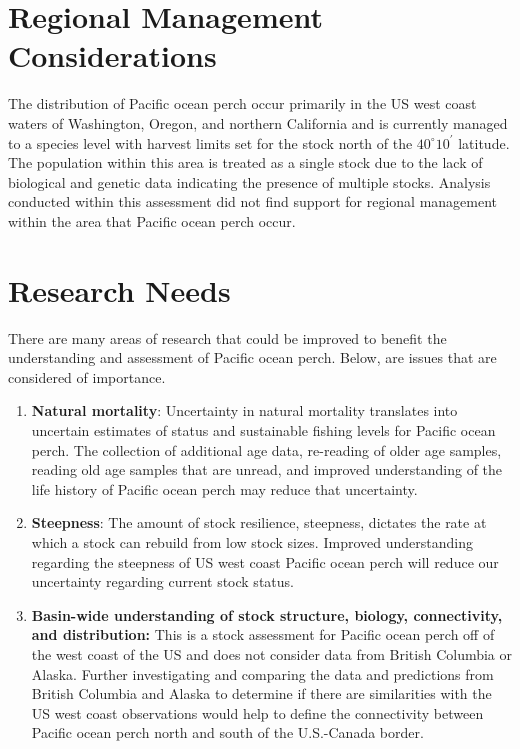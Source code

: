 \documentclass[12pt,]{article}
\begin{document}
\section{Regional Management
Considerations}\label{regional-management-considerations}

The distribution of Pacific ocean perch occur primarily in the US west
coast waters of Washington, Oregon, and northern California and is
currently managed to a species level with harvest limits set for the
stock north of the \(40^\circ 10^\prime\) latitude. The population
within this area is treated as a single stock due to the lack of
biological and genetic data indicating the presence of multiple stocks.
Analysis conducted within this assessment did not find support for
regional management within the area that Pacific ocean perch occur.

\section{Research Needs}\label{research-needs}

There are many areas of research that could be improved to benefit the
understanding and assessment of Pacific ocean perch. Below, are issues
that are considered of importance.

\begin{enumerate}

\item \textbf{Natural mortality}: Uncertainty in natural mortality translates into uncertain estimates of status and sustainable fishing levels for Pacific ocean perch. The collection of additional age data, re-reading of older age samples, reading old age samples that are unread, and improved understanding of the life history of Pacific ocean perch may reduce that uncertainty.

\item \textbf{Steepness}: The amount of stock resilience, steepness, dictates the rate at which a stock can rebuild from low stock sizes.  Improved understanding regarding the steepness of US west coast Pacific ocean perch will reduce our uncertainty regarding current stock status.

\item \textbf{Basin-wide understanding of stock structure, biology, connectivity, and distribution:} This is a stock assessment for Pacific ocean perch off of the west coast of the US and does not consider data from British Columbia or Alaska. Further investigating and comparing the data and predictions from British Columbia and Alaska to determine if there are similarities with the US west coast observations would help to define the connectivity between Pacific ocean perch north and south of the U.S.-Canada border.


\end{enumerate}
\end{document}
